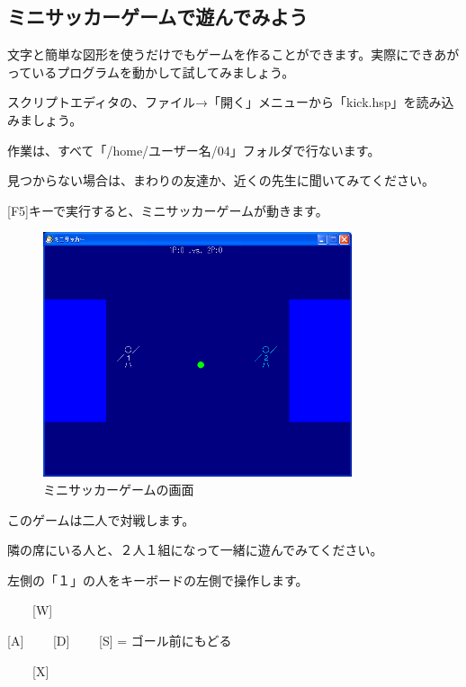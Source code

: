 \newpage
\subsection{ミニサッカーゲームで遊んでみよう}



文字と簡単な図形を使うだけでもゲームを作ることができます。実際にできあがっているプログラムを動かして試してみましょう。

スクリプトエディタの、ファイル→「開く」メニューから「kick.hsp」を読み込みましょう。

作業は、すべて「/home/ユーザー名/04」フォルダで行ないます。

見つからない場合は、まわりの友達か、近くの先生に聞いてみてください。



[F5]キーで実行すると、ミニサッカーゲームが動きます。



\begin{figure}[H]
    \begin{center}
      \includegraphics[keepaspectratio,width=9.075cm,height=7.197cm]{text04-img/text04-img005.png}
      \caption{ミニサッカーゲームの画面}
    \end{center}
    \label{fig:prog_menu}
\end{figure}


このゲームは二人で対戦します。

隣の席にいる人と、２人１組になって一緒に遊んでみてください。

左側の「１」の人をキーボードの左側で操作します。




\ \ \ \ [W]

[A] \ \ \ \ [D] \ \ \ \ [S] = ゴール前にもどる

\ \ \ \ [X]



